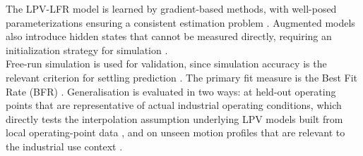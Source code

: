 The LPV-LFR model is learned by gradient-based methods, with well-posed parameterizations ensuring a consistent estimation problem \cite{hoekstra2026lfr, drenth2025lpvlfr}. Augmented models also introduce hidden states that cannot be measured directly, requiring an initialization strategy for simulation \cite{hoekstra2026encoder}.
\\
Free-run simulation is used for validation, since simulation accuracy is the relevant criterion for settling prediction \cite{champneys2024baseline}. The primary fit measure is the Best Fit Rate (BFR) \cite{toth2010modeling, drenth2025lpvlfr}.
Generalisation is evaluated in two ways: at held-out operating points that are representative of actual industrial operating conditions, which directly tests the interpolation assumption underlying LPV models built from local operating-point data \cite{paijmans2008identification, bachnas2014review}, and on unseen motion profiles that are relevant to the industrial use context \cite{champneys2024baseline}.
